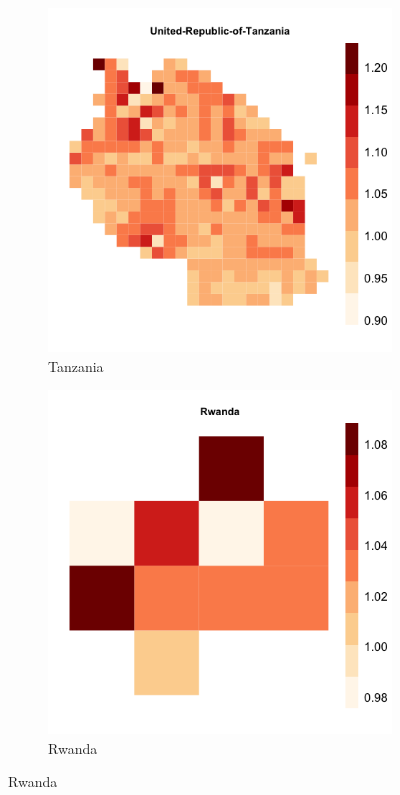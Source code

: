 \documentclass[11pt, oneside]{article}   	%
\begin{document}
\begin{figure}[!ph]
\begin{subfigure}[c]{0.32\textwidth}
\includegraphics[width=\textwidth]{../../Analysis/output/zeta_heatmaps/United-Republic-of-Tanzania_zeta.png}
\caption{Tanzania}
\label{fig:Tanzania_zeta}
\end{subfigure}
\begin{subfigure}[c]{0.32\textwidth}
\includegraphics[width=\textwidth]{../../Analysis/output/zeta_heatmaps/Rwanda_zeta.png}
\caption{Rwanda}
\label{fig:Rwanda_zeta}
\end{subfigure}


\end{figure}
\end{document}
